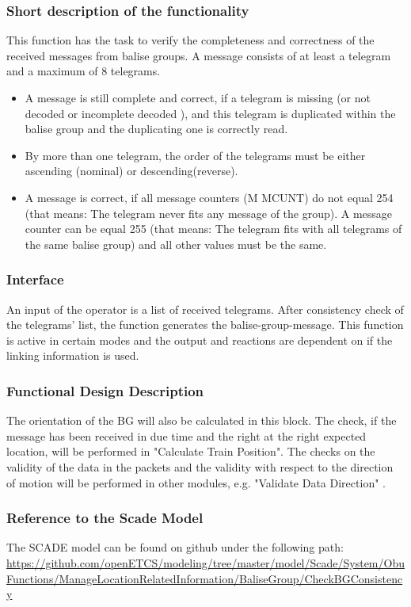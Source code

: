 \subsubsection{Short description of the functionality}
This function has the task  to verify the completeness and correctness of the received messages from balise groups. A message consists of at least a telegram and a maximum of 8 telegrams.

\begin{itemize}
\item A message is still complete and correct, if a telegram is missing (or not decoded or incomplete decoded ), and this telegram is duplicated within the balise group and the duplicating one is correctly read.
\item By more than one telegram, the order of the telegrams must be either ascending (nominal) or descending(reverse).
\item A message is correct, if  all message counters (M MCUNT) do not equal 254 (that means: The telegram never fits any message of the group). A message counter can be equal 255 (that means: The telegram fits with all telegrams of the same balise group) and all other values must be the same.
\end{itemize}

\subsubsection{Interface}
An input of the operator is a list of received telegrams. After consistency check of the telegrams' list, the function generates the balise-group-message. This function is active in certain modes and the output and reactions are dependent on if the linking information is used.

\subsubsection{Functional Design Description}
The orientation of the BG will also be calculated in this block. The check, if the message has been received in due time and the right at the right expected location, will be performed in "Calculate Train Position". The checks on the validity of the data in the packets and the validity with respect to the direction of motion will be performed in other modules, e.g. "Validate Data Direction" .

\subsubsection{Reference to the Scade Model}
The SCADE model can be found on github under the following path: \url{https://github.com/openETCS/modeling/tree/master/model/Scade/System/ObuFunctions/ManageLocationRelatedInformation/BaliseGroup/CheckBGConsistency}


